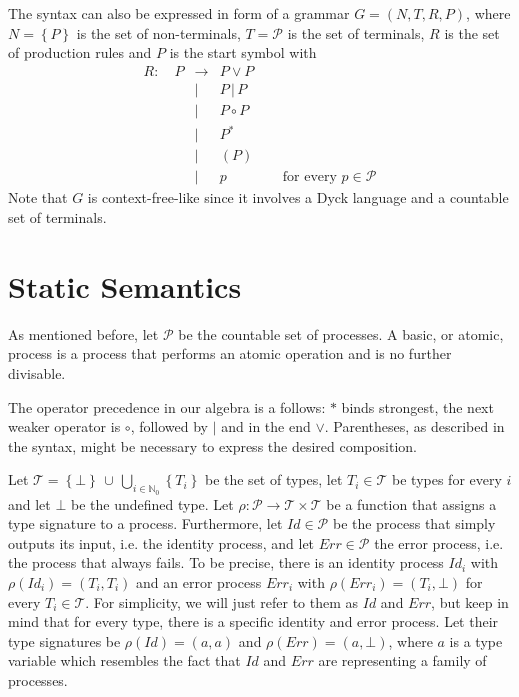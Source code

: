 The syntax can also be expressed in form of a grammar $G = \left( N, T, R, P \right)$, where $N = \left\{ P \right\}$ is the set of non-terminals, $T = \mathcal{P}$ is the set of terminals, $R$ is the set of production rules and $P$ is the start symbol \cite{Hopcroft:2006:IAT:1196416} with %
\begin{eqnarray*}
  R \colon \quad P & \to & P \vee P \\
    & | & P \,|\, P \\
    & | & P \circ P \\
    & | & P^* \\
    & | & \left( P \right) \\
    & | & p \quad\quad\quad\quad \text{for every } p \in \mathcal{P}
\end{eqnarray*}
Note that $G$ is context-free-like since it involves a Dyck language \cite{} and a countable set of terminals.






\section{Static Semantics}
\label{chp:static_semantics}
As mentioned before, let $\mathcal{P}$ be the countable set of processes. A basic, or atomic, process is a process that performs an atomic operation and is no further divisable.

The operator precedence in our algebra is a follows: $*$ binds strongest, the next weaker operator is $\circ$, followed by $|$ and in the end $\vee$. Parentheses, as described in the syntax, might be necessary to express the desired composition.

Let $\mathcal{T} = \left\{ \bot \right\} \, \cup \, \bigcup_{i \in \mathbb{N}_0} \left\{ T_i \right\}$ be the set of types, let $T_i \in \mathcal{T}$ be types for every $i$ and let $\bot$ be the undefined type. Let $\rho \colon \mathcal{P} \to \mathcal{T} \times \mathcal{T}$ be a function that assigns a type signature to a process. Furthermore, let $Id \in \mathcal{P}$ be the process that simply outputs its input, i.e. the identity process, and let $Err \in \mathcal{P}$ the error process, i.e. the process that always fails. To be precise, there is an identity process $Id_i$ with $\rho \left( Id_i \right) = \left( T_i, T_i \right)$ and an error process $Err_i$ with $\rho \left( Err_i \right) = \left( T_i, \bot \right)$ for every $T_i \in \mathcal{T}$. For simplicity, we will just refer to them as $Id$ and $Err$, but keep in mind that for every type, there is a specific identity and error process. Let their type signatures be $\rho \left( Id \right) = \left( a, a \right)$ and $\rho \left( Err \right) = \left( a, \bot \right)$, where $a$ is a type variable which resembles the fact that $Id$ and $Err$ are representing a family of processes.


